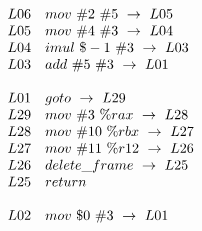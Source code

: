 \[\begin{array}{l l}
        L06 & mov \ \#2 \ \#5 \ \rightarrow \ L05\\
        L05 & mov \ \#4 \ \#3 \ \rightarrow \ L04\\
        L04 & imul \ \$-1 \ \#3 \ \rightarrow \ L03\\
        L03 & add \ \#5 \ \#3 \ \rightarrow \ L01\\
         & \\
        L01 & goto \ \rightarrow \ L29\\
        L29 & mov \ \#3 \ \%rax \ \rightarrow \ L28\\
        L28 & mov \ \#10 \ \%rbx \ \rightarrow \ L27\\
        L27 & mov \ \#11 \ \%r12 \ \rightarrow \ L26\\
        L26 & delete\_frame \ \rightarrow \ L25\\
        L25 & return \\
        \\
        L02 & mov \ \$0 \ \#3 \ \rightarrow \ L01\\

    \end{array}
\]

